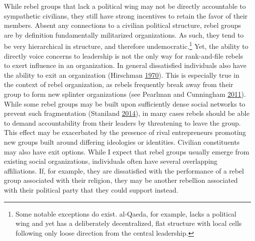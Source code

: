 \documentclass[12pt,]{book}
\let\rmarkdownfootnote\footnote%
\def\footnote{\protect\rmarkdownfootnote}
\theoremstyle{definition}
\theoremstyle{definition}
\theoremstyle{definition}
\theoremstyle{remark}
\begin{document}
While rebel groups that lack a political wing may not be directly
accountable to sympathetic civilians, they still have strong incentives
to retain the favor of their members. Absent any connections to a
civilian political structure, rebel groups are by definition
fundamentally militarized organizations. As such, they tend to be very
hierarchical in structure, and therefore undemocratic.\footnote{Some
  notable exceptions do exist. al-Qaeda, for example, lacks a political
  wing and yet has a deliberately decentralized, flat structure with
  local cells following only loose direction from the central
  leadership.} Yet, the ability to directly voice concerns to leadership
is not the only way for rank-and-file rebels to exert influence in an
organization. In general dissatisfied individuals also have the ability
to exit an organization (Hirschman
\protect\hyperlink{ref-Hirschman1970}{1970}). This is especially true in
the context of rebel organization, as rebels frequently break away from
their group to form new splinter organizations (see Pearlman and
Cunningham \protect\hyperlink{ref-Pearlman2011}{2011}). While some rebel
groups may be built upon sufficiently dense social networks to prevent
such fragmentation (Staniland
\protect\hyperlink{ref-Staniland2014}{2014}), in many cases rebels
should be able to demand accountability from their leaders by
threatening to leave the group. This effect may be exacerbated by the
presence of rival entrepreneurs promoting new groups built around
differing ideologies or identities. Civilian constituents may also have
exit options. While I expect that rebel groups usually emerge from
existing social organizations, individuals often have several
overlapping affiliations. If, for example, they are dissatisfied with
the performance of a rebel group associated with their religion, they
may be another rebellion associated with their political party that they
could support instead.
\end{document}

